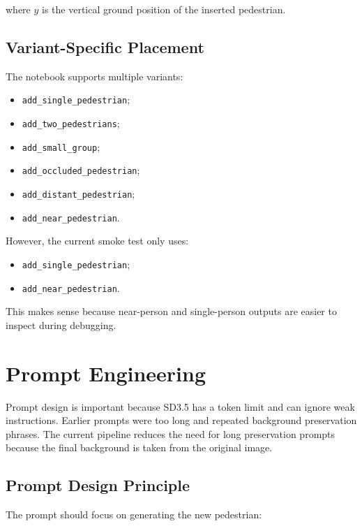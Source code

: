 \documentclass[12pt,a4paper]{article}
\begin{document}
where $y$ is the vertical ground position of the inserted pedestrian.

\subsection{Variant-Specific Placement}

The notebook supports multiple variants:

\begin{itemize}
    \item \texttt{add\_single\_pedestrian};
    \item \texttt{add\_two\_pedestrians};
    \item \texttt{add\_small\_group};
    \item \texttt{add\_occluded\_pedestrian};
    \item \texttt{add\_distant\_pedestrian};
    \item \texttt{add\_near\_pedestrian}.
\end{itemize}

However, the current smoke test only uses:

\begin{itemize}
    \item \texttt{add\_single\_pedestrian};
    \item \texttt{add\_near\_pedestrian}.
\end{itemize}

This makes sense because near-person and single-person outputs are easier to
inspect during debugging.

\section{Prompt Engineering}

Prompt design is important because SD3.5 has a token limit and can ignore weak
instructions. Earlier prompts were too long and repeated background preservation
phrases. The current pipeline reduces the need for long preservation prompts
because the final background is taken from the original image.

\subsection{Prompt Design Principle}

The prompt should focus on generating the new pedestrian:
\end{document}
